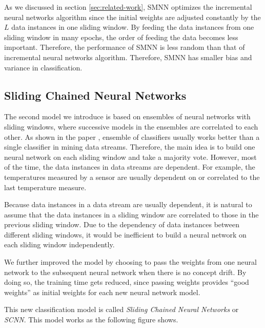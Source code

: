 \documentclass[conference]{IEEEtran}
\begin{document}
		As we discussed in section \ref{sec:related-work}, SMNN optimizes the incremental neural networks algorithm since the initial weights are adjusted constantly by the $L$ data instances in one sliding window. By feeding the data instances from one sliding window in many epochs, the order of feeding the data becomes less important. Therefore, the performance of SMNN is less random than that of incremental neural networks algorithm. Therefore, SMNN has smaller bias and variance in classification.
		
		
		\subsection{Sliding Chained Neural Networks}
		\label{sec:scnn}
		The second model we introduce is based on ensembles of neural networks with sliding windows, where successive models in the ensembles are correlated to each other. As shown in the paper \cite{ensemble1}, ensemble of classifiers usually works better than a single classifier in mining data streams. Therefore, the main idea is to build one neural network on each sliding window and take a majority vote. However, most of the time, the data instances in data streams are dependent. For example, the temperatures measured by a sensor are usually dependent on or correlated to the last temperature measure.
		
		Because data instances in a data stream are usually dependent, it is natural to assume that the data instances in a sliding window are correlated to those in the previous sliding window.  Due to the dependency of data instances between different sliding windows, it would be inefficient to build a neural network on each sliding window independently.   
		
		We further improved the model by choosing to pass the weights from one neural network to the subsequent neural network when there is no concept drift. By doing so, the training time gets reduced, since passing weights provides ``good weights'' as  initial weights for each new neural network model.
		
		This new classification model is called \emph{Sliding Chained Neural Networks} or \emph{SCNN}. This model works as the following figure shows.
		
		
\end{document}
